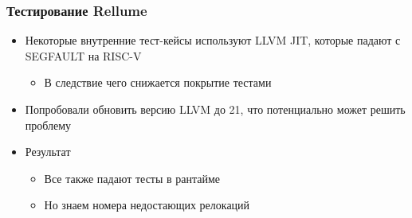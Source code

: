 \documentclass{beamer}
\begin{document}
\begin{frame}[fragile]
	\frametitle{Тестирование Rellume}
	\begin{itemize}
		\item Некоторые внутренние тест-кейсы используют LLVM JIT, которые падают с SEGFAULT на RISC-V
		      \begin{itemize}
			      \item В следствие чего снижается покрытие тестами
		      \end{itemize}
		\item Попробовали обновить версию LLVM до 21, что потенциально может решить проблему
		\item Результат
		      \begin{itemize}
			      \item Все также падают тесты в рантайме
			      \item Но знаем номера недостающих релокаций
		      \end{itemize}

	\end{itemize}
\end{frame}
\end{document}
